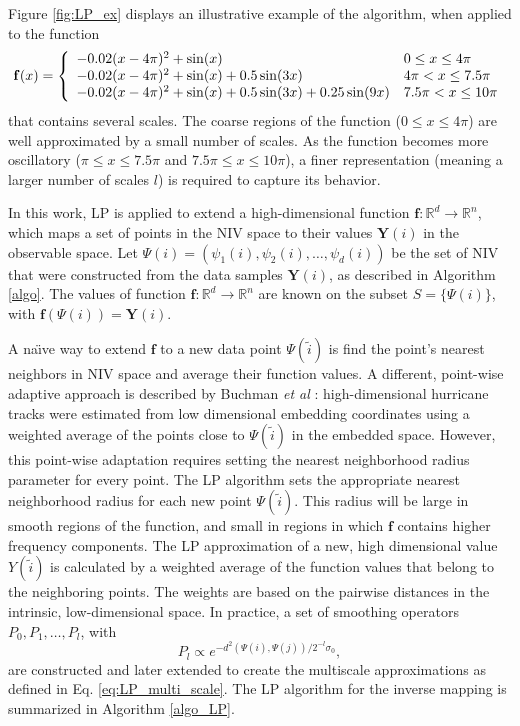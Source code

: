 \documentclass[aip,jcp,preprint]{revtex4-1}
\begin{document}
\begin{widetext}
Figure \ref{fig:LP_ex} displays an illustrative example of the algorithm, when applied to the function
 \begin{equation} \label{eq:LP_example}
\mathbf{f}(x) = \left\{
\begin{array}{l l}
-0.02(x-4\pi)^2 + \sin(x) &  0 \le x \le 4\pi \\
-0.02(x-4\pi)^2 + \sin(x) + 0.5 \sin(3x) &  4\pi < x \le 7.5 \pi \\
-0.02(x-4\pi)^2 + \sin(x) + 0.5 \sin(3x) +0.25 \sin(9x) &  7.5 \pi < x \le 10 \pi
\end{array}
\right.
\end{equation}
that contains several scales.
%
The coarse regions of the function ($0 \le x \le 4\pi$) are well approximated by a small number of scales.
%
As the function becomes more oscillatory ($\pi \le x \le 7.5\pi$ and $7.5\pi \le x \le 10\pi$),
a finer representation (meaning a larger number of scales  $l$) is required to capture its behavior.
\end{widetext}

In this work, LP is applied to extend a high-dimensional function $\mathbf{f}:\mathbb{R}^d \rightarrow \mathbb{R}^n$,
which maps a set of points in the NIV space to their values $\mathbf{Y}(i)$ in the observable space.
%
Let $\Psi(i) = \left(\psi_1(i),\psi_2(i),\ldots,\psi_d(i)\right)$ be the set of NIV that were constructed from the data samples $\mathbf{Y}(i)$, as described in Algorithm \ref{algo}.
%
The values of function $\mathbf{f}:\mathbb{R}^d \rightarrow \mathbb{R}^n$ are known on the subset $S = \{\Psi(i)\}$, with $\mathbf{f}(\Psi(i)) = \mathbf{Y}(i)$.

A na\"{\i}ve way to extend $\mathbf{f}$ to a new data point $\Psi(\tilde{i})$ is find the point's nearest neighbors in NIV space and average their function values.
%
A different, point-wise adaptive approach is described by Buchman {\em et al} \cite{buchman2011high}:
high-dimensional hurricane tracks were estimated from low dimensional embedding coordinates using a weighted average of the points close to $\Psi(\tilde{i})$ in the embedded space.
%
However, this point-wise adaptation requires setting the nearest neighborhood radius parameter for every point.
%
The LP algorithm sets the appropriate nearest neighborhood radius for each new point $\Psi(\tilde{i})$.
%
This radius will be large in smooth regions of the function, and small in regions in which $\mathbf{f}$ contains higher frequency components.
%
The LP approximation of a new, high dimensional value $Y(\tilde{i})$ is calculated by a weighted average of the function values that belong to the neighboring points.
%
The weights are based on the pairwise distances in the intrinsic, low-dimensional space.
%
In practice, a set of smoothing operators $P_0, P_1, \ldots, P_l$, with
\begin{equation} \label{eq:LP_multi_scale_app}
P_l \propto e^{-d^2(\Psi(i),\Psi(j)) / 2^{-l} \sigma_0},
\end{equation}
are constructed and later extended to create the multiscale approximations as defined in Eq. \ref{eq:LP_multi_scale}.
%
The LP algorithm for the inverse mapping is summarized in Algorithm \ref{algo_LP}.
\end{document}
